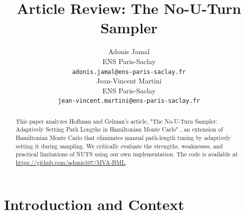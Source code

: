 \documentclass{article}
\title{Article Review: The No-U-Turn Sampler}
\author{%
  Adonis Jamal \\
  ENS Paris-Saclay \\
  \texttt{\small adonis.jamal@ens-paris-saclay.fr}\\
  \And
  Jean-Vincent Martini \\ 
  ENS Paris-Saclay \\
  \texttt{\small jean-vincent.martini@ens-paris-saclay.fr} \\
}
\begin{document}
\maketitle


\begin{abstract}
  This paper analyzes Hoffman and Gelman's article, "The No-U-Turn Sampler: Adaptively Setting Path Lengths in Hamiltonian Monte Carlo" \cite{main}, an extension of Hamiltonian Monte Carlo that eliminates manual path-length tuning by adaptively setting it during sampling. We critically evaluate the strengths, weaknesses, and practical limitations of NUTS using our own implementation. The code is available at \url{https://github.com/adonis107/MVA-BML}.
\end{abstract}

\vspace*{-1cm}

\section{Introduction and Context}
\end{document}

